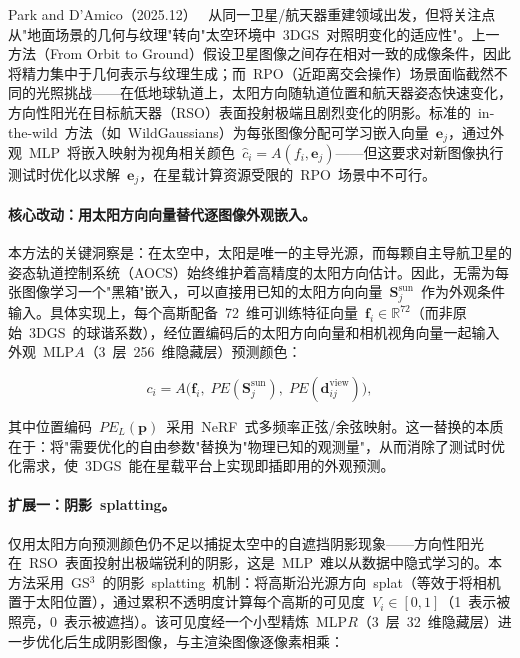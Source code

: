 Park and D'Amico（2025.12）~\cite{2512_23998} 从同一卫星/航天器重建领域出发，但将关注点从"地面场景的几何与纹理"转向"太空环境中~3DGS~对照明变化的适应性"。上一方法（From Orbit to Ground）假设卫星图像之间存在相对一致的成像条件，因此将精力集中于几何表示与纹理生成；而~RPO（近距离交会操作）场景面临截然不同的光照挑战——在低地球轨道上，太阳方向随轨道位置和航天器姿态快速变化，方向性阳光在目标航天器（RSO）表面投射极端且剧烈变化的阴影。标准的~in-the-wild~方法（如~WildGaussians）为每张图像分配可学习嵌入向量~$\boldsymbol{e}_j$，通过外观~MLP~将嵌入映射为视角相关颜色~$\hat{c}_i = A(f_i, \boldsymbol{e}_j)$——但这要求对新图像执行测试时优化以求解~$\boldsymbol{e}_j$，在星载计算资源受限的~RPO~场景中不可行。

\paragraph{核心改动：用太阳方向向量替代逐图像外观嵌入。}
本方法的关键洞察是：在太空中，太阳是唯一的主导光源，而每颗自主导航卫星的姿态轨道控制系统（AOCS）始终维护着高精度的太阳方向估计。因此，无需为每张图像学习一个"黑箱"嵌入，可以直接用已知的太阳方向向量~$\boldsymbol{S}_j^{\text{sun}}$~作为外观条件输入。具体实现上，每个高斯配备~72~维可训练特征向量~$\boldsymbol{f}_i \in \mathbb{R}^{72}$（而非原始~3DGS~的球谐系数），经位置编码后的太阳方向向量和相机视角向量一起输入外观~MLP$A$（3~层~256~维隐藏层）预测颜色：

\begin{equation}
    c_i = A\bigl(\boldsymbol{f}_i,\; PE(\boldsymbol{S}_j^{\text{sun}}),\; PE(\boldsymbol{d}_{ij}^{\text{view}})\bigr),
\end{equation}

其中位置编码~$PE_L(\boldsymbol{p})$~采用~NeRF~式多频率正弦/余弦映射。这一替换的本质在于：将"需要优化的自由参数"替换为"物理已知的观测量"，从而消除了测试时优化需求，使~3DGS~能在星载平台上实现即插即用的外观预测。

\paragraph{扩展一：阴影~splatting。}
仅用太阳方向预测颜色仍不足以捕捉太空中的自遮挡阴影现象——方向性阳光在~RSO~表面投射出极端锐利的阴影，这是~MLP~难以从数据中隐式学习的。本方法采用~GS$^3$~的阴影~splatting~机制：将高斯沿光源方向~splat（等效于将相机置于太阳位置），通过累积不透明度计算每个高斯的可见度~$V_i \in [0, 1]$（1~表示被照亮，0~表示被遮挡）。该可见度经一个小型精炼~MLP$R$（3~层~32~维隐藏层）进一步优化后生成阴影图像，与主渲染图像逐像素相乘：

